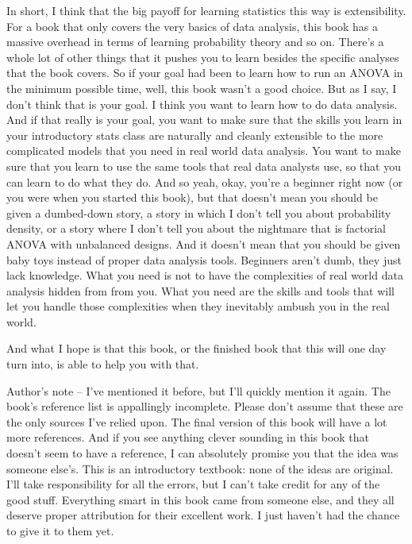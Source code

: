 \documentclass[
  a4paper,
]{book}
\begin{document}
In short, I think that the big payoff for learning statistics this way
is extensibility. For a book that only covers the very basics of data
analysis, this book has a massive overhead in terms of learning
probability theory and so on. There's a whole lot of other things that
it pushes you to learn besides the specific analyses that the book
covers. So if your goal had been to learn how to run an ANOVA in the
minimum possible time, well, this book wasn't a good choice. But as I
say, I don't think that is your goal. I think you want to learn how to
do data analysis. And if that really is your goal, you want to make sure
that the skills you learn in your introductory stats class are naturally
and cleanly extensible to the more complicated models that you need in
real world data analysis. You want to make sure that you learn to use
the same tools that real data analysts use, so that you can learn to do
what they do. And so yeah, okay, you're a beginner right now (or you
were when you started this book), but that doesn't mean you should be
given a dumbed-down story, a story in which I don't tell you about
probability density, or a story where I don't tell you about the
nightmare that is factorial ANOVA with unbalanced designs. And it
doesn't mean that you should be given baby toys instead of proper data
analysis tools. Beginners aren't dumb, they just lack knowledge. What
you need is not to have the complexities of real world data analysis
hidden from from you. What you need are the skills and tools that will
let you handle those complexities when they inevitably ambush you in the
real world.

And what I hope is that this book, or the finished book that this will
one day turn into, is able to help you with that.

Author's note -- I've mentioned it before, but I'll quickly mention it
again. The book's reference list is appallingly incomplete. Please don't
assume that these are the only sources I've relied upon. The final
version of this book will have a lot more references. And if you see
anything clever sounding in this book that doesn't seem to have a
reference, I can absolutely promise you that the idea was someone
else's. This is an introductory textbook: none of the ideas are
original. I'll take responsibility for all the errors, but I can't take
credit for any of the good stuff. Everything smart in this book came
from someone else, and they all deserve proper attribution for their
excellent work. I just haven't had the chance to give it to them yet.
\end{document}
